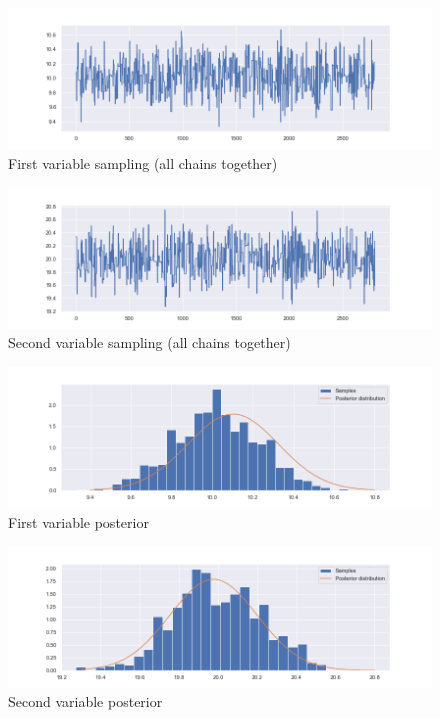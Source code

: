 \documentclass {article}
\begin{document}
\begin{figure}[h!]
	\centering
	\includegraphics[width=\textwidth]{immagini_coupling_multivariate/coupling_mult_sampling_1}	
	\caption{First variable sampling (all chains together)}
\end{figure}
\begin{figure}[h!]
	\centering
	\includegraphics[width=\textwidth]{immagini_coupling_multivariate/coupling_mult_sampling_2}	
	\caption{Second variable sampling (all chains together)}
\end{figure}



\begin{figure}[h!]
	\centering
	\includegraphics[width=\textwidth]{immagini_coupling_multivariate/coupling_mult_histogram_1}	
	\caption{First variable posterior}
\end{figure}
\begin{figure}[h!]
	\centering
	\includegraphics[width=\textwidth]{immagini_coupling_multivariate/coupling_mult_histogram_2}
	\caption{Second variable posterior}
\end{figure}
\end{document}

